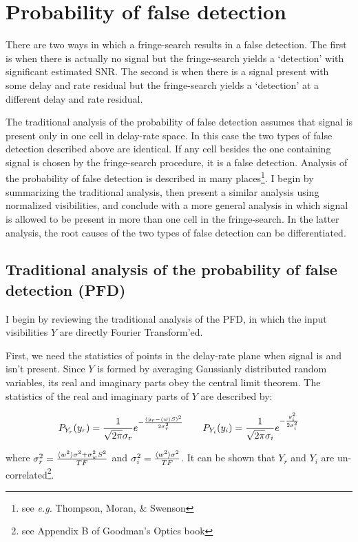 \section{Probability of false detection}

There are two ways in which a fringe-search results in a false
detection.  The first is when there is actually no signal but the
fringe-search yields a `detection' with significant estimated SNR.
The second is when there is a signal present with some delay and rate
residual but the fringe-search yields a `detection' at a different
delay and rate residual.

The traditional analysis of the probability of false detection assumes
that signal is present only in one cell in delay-rate space.  In this
case the two types of false detection described above are identical.
If any cell besides the one containing signal is chosen by the
fringe-search procedure, it is a false detection.  Analysis of the
probability of false detection is described in many
places\footnote{see {\it e.g.} Thompson, Moran, \& Swenson}.  I begin
by summarizing the traditional analysis, then present a similar
analysis using normalized visibilities, and conclude with a more
general analysis in which signal is allowed to be present in more than
one cell in the fringe-search.  In the latter analysis, the root
causes of the two types of false detection can be differentiated.

\subsection{Traditional analysis of the probability of false detection (PFD)}

I begin by reviewing the traditional analysis of the PFD, in which the
input visibilities $Y$ are directly Fourier Transform'ed.

First, we need the statistics of points in the delay-rate plane when
signal is and isn't present.  Since $Y$ is formed by averaging
Gaussianly distributed random variables, its real and imaginary parts
obey the central limit theorem.  The statistics of the real and
imaginary parts of $Y$ are described by:

$$P_{Y_r}(y_r) = {1\over\sqrt{2\pi}\sigma_r}
                  e^{-{(y_r - \langle w\rangle S)^2\over2\sigma_r^2}} \qquad
  P_{Y_i}(y_i) = {1\over\sqrt{2\pi}\sigma_i}
                  e^{-{y_i^2\over2\sigma_i^2}}$$

where $\sigma_r^2 = {\langle w^2\rangle \sigma^2 + \sigma_w^2S^2\over
TF}$ and $\sigma_i^2 = {\langle w^2\rangle \sigma^2\over TF}$.  It can
be shown that $Y_r$ and $Y_i$ are un-correlated\footnote{see Appendix
B of Goodman's Optics book}.

